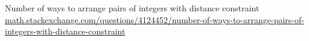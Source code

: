 \documentclass[10pt]{article}
\numberwithin{equation}{section}
\begin{document}
\begin{thebibliography}{100}

Number of ways to arrange pairs of integers with distance constraint
\href{https://math.stackexchange.com/questions/4124452/number-of-ways-to-arrange-pairs-of-integers-with-distance-constraint}{math.stackexchange.com/questions/4124452/number-of-ways-to-arrange-pairs-of-integers-with-distance-constraint}

\end{thebibliography}
%
\end{document}
